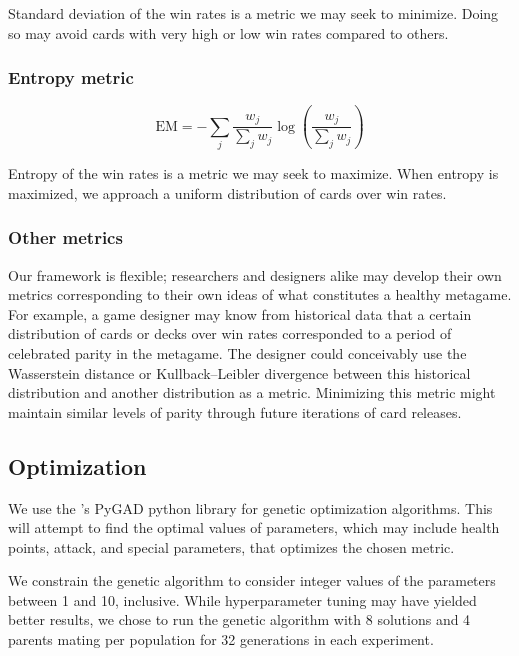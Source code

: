 Standard deviation of the win rates is a metric we may seek to minimize. Doing so may avoid cards with
very high or low win rates compared to others.

\subsubsection{Entropy metric}

\begin{equation}
	\mathrm{EM} = -\sum_j \frac{w_j}{\sum_j w_j} \log\left(\frac{w_j}{\sum_j w_j}\right)
\end{equation}

Entropy of the win rates is a metric we may seek to maximize. When entropy is maximized, we approach a uniform
distribution of cards over win rates.

\subsubsection{Other metrics}

Our framework is flexible; researchers and designers alike may develop their own metrics corresponding to their
own ideas of what constitutes a healthy metagame. For example, a game designer may know from historical data that
a certain distribution of cards or decks over win rates corresponded to a period of celebrated parity in the metagame. 
The designer could conceivably use the Wasserstein distance or Kullback--Leibler 
divergence between this historical distribution and another distribution as a metric. Minimizing this metric 
might maintain similar levels of parity through future iterations of card releases.

\subsection{Optimization}

We use the \citeauthor{gad2021pygad}'s  PyGAD python library for genetic optimization algorithms. This will attempt to find the optimal values of
parameters, which may include health points, attack, and special parameters, that optimizes
the chosen metric.

We constrain the genetic algorithm to consider integer values of the parameters between 1 and 10, inclusive. While hyperparameter tuning may have yielded better results,
we chose to run the genetic algorithm with 8 solutions and 4 parents mating per population for 32 generations in each experiment.

